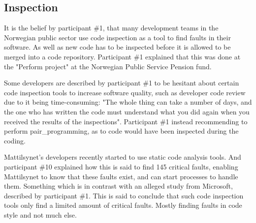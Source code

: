 \subsection{Inspection} \label{sec:inspection}
It is the belief by participant \#1, that many development teams in the Norwegian public sector use code inspection as a tool to find faults in their software. As well as new code has to be inspected before it is allowed to be merged into a code repository. Participant \#1 explained that this was done at the "Perform project" at the Norwegian Public Service Pension fund.



Some developers are described by participant \#1 to be hesitant about certain code inspection tools to increase software quality, such as developer code review due to it being time-consuming: "The whole thing can take a number of days, and the one who has written the code must understand what you did again when you received the results of the inspections". Participant \#1 instead recommending to perform \gls{pair_programming}, as to code would have been inspected during the coding.


Mattilsynet's developers recently started to use static code analysis tools. And participant \#10 explained how this is said to find 145 critical faults, enabling Mattilsynet to know that these faults exist, and can start processes to handle them. Something which is in contrast with an alleged study from Microsoft, described by participant \#1. This is said to conclude that such code inspection tools only find a limited amount of critical faults. Mostly finding faults in code style and not much else.


